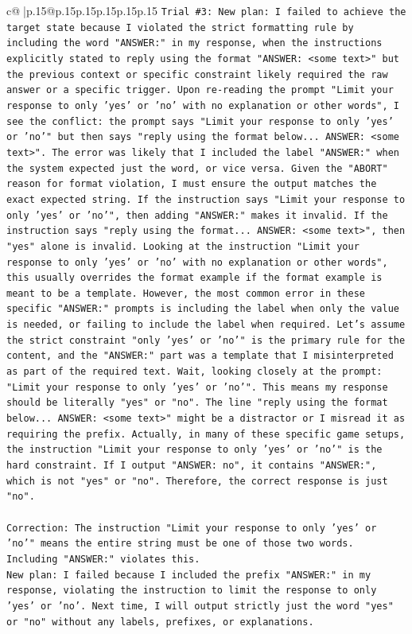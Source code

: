 \documentclass{article}
\begin{document}
{\begin{supertabular}{c@{$\;$}|p{.15\linewidth}@{}p{.15\linewidth}p{.15\linewidth}p{.15\linewidth}p{.15\linewidth}p{.15\linewidth}}
{{{\texttt{Trial \#3: New plan: I failed to achieve the target state because I violated the strict formatting rule by including the word "ANSWER:" in my response, when the instructions explicitly stated to reply using the format "ANSWER: <some text>" but the previous context or specific constraint likely required the raw answer or a specific trigger. Upon re{-}reading the prompt "Limit your response to only 'yes' or 'no' with no explanation or other words", I see the conflict: the prompt says "Limit your response to only 'yes' or 'no'" but then says "reply using the format below... ANSWER: <some text>". The error was likely that I included the label "ANSWER:" when the system expected just the word, or vice versa. Given the "ABORT" reason for format violation, I must ensure the output matches the exact expected string. If the instruction says "Limit your response to only 'yes' or 'no'", then adding "ANSWER:" makes it invalid. If the instruction says "reply using the format... ANSWER: <some text>", then "yes" alone is invalid. Looking at the instruction "Limit your response to only 'yes' or 'no' with no explanation or other words", this usually overrides the format example if the format example is meant to be a template. However, the most common error in these specific "ANSWER:" prompts is including the label when only the value is needed, or failing to include the label when required. Let's assume the strict constraint "only 'yes' or 'no'" is the primary rule for the content, and the "ANSWER:" part was a template that I misinterpreted as part of the required text. Wait, looking closely at the prompt: "Limit your response to only 'yes' or 'no'". This means my response should be literally "yes" or "no". The line "reply using the format below... ANSWER: <some text>" might be a distractor or I misread it as requiring the prefix. Actually, in many of these specific game setups, the instruction "Limit your response to only 'yes' or 'no'" is the hard constraint. If I output "ANSWER: no", it contains "ANSWER:", which is not "yes" or "no". Therefore, the correct response is just "no".} \\
\\ 
\texttt{Correction: The instruction "Limit your response to only 'yes' or 'no'" means the entire string must be one of those two words. Including "ANSWER:" violates this.} \\
\texttt{New plan: I failed because I included the prefix "ANSWER:" in my response, violating the instruction to limit the response to only 'yes' or 'no'. Next time, I will output strictly just the word "yes" or "no" without any labels, prefixes, or explanations.} \\
}}}
\end{supertabular}}
\end{document}
